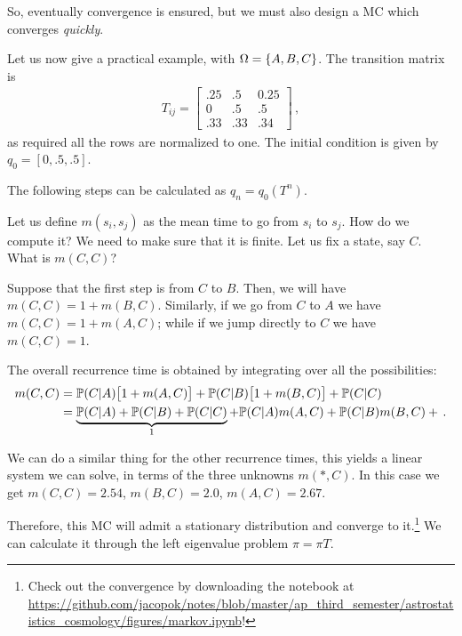 \documentclass[main.tex]{subfiles}
\begin{document}
So, eventually convergence is ensured, but we must also design a MC which converges \emph{quickly}. 

Let us now give a practical example, with \(\Omega = \qty{A, B, C}\).
The transition matrix is 
%
\begin{align}
T_{ij} = 
\left[\begin{array}{ccc}
\num{.25} & \num{.5} & \num{0.25} \\ 
0 & \num{.5} & \num{.5} \\ 
\num{.33} & \num{.33} & \num{.34}
\end{array}\right]
\,,
\end{align}
%
as required all the rows are normalized to one. 
The initial condition is given by \(q_0 = [0, \num{.5}, \num{.5}]\).

The following steps can be calculated as \(q_n = q_0 (T^{n}) \).

Let us define \(m(s_i, s_j)\) as the mean time to go from \(s_i\) to \(s_j\). How do we compute it? We need to make sure that it is finite.
Let us fix a state, say \(C\). What is \(m(C, C)\)?

Suppose that the first step is from \(C\) to \(B\). Then, we will have \(m(C,C) = 1 + m(B, C)\). Similarly, if we go from \(C\) to \(A\) we have \(m(C, C) = 1 + m(A, C)\); while if we jump directly to \(C\) we have \(m(C, C) =1\). 

The overall recurrence time is obtained by integrating over all the possibilities: 
%
\begin{align}
m(C, C) &= 
\mathbb{P}(C | A) \qty[1 + m(A, C)] + 
\mathbb{P}(C | B) \qty[1 + m(B, C)] 
+  \mathbb{P}(C | C)  \\
&= 
\underbrace{\mathbb{P}(C |A ) +
\mathbb{P}(C |B) +
\mathbb{P}(C |C )}_{1} +
\mathbb{P}(C |A ) m(A, C) +
\mathbb{P}(C |B ) m(B, C) +
\,.
\end{align}

We can do a similar thing for the other recurrence times, this yields a linear system we can solve, in terms of the three unknowns \(m(*, C)\). 
In this case we get \(m(C, C) = \num{2.54}\), \(m(B, C) = \num{2.0}\), \(m(A,C) = \num{2.67}\). 

Therefore, this MC will admit a stationary distribution and converge to it.\footnote{Check out the convergence by downloading the notebook at \url{https://github.com/jacopok/notes/blob/master/ap_third_semester/astrostatistics_cosmology/figures/markov.ipynb}!}
We can calculate it through the left eigenvalue problem \(\pi = \pi T\). 
\end{document}
